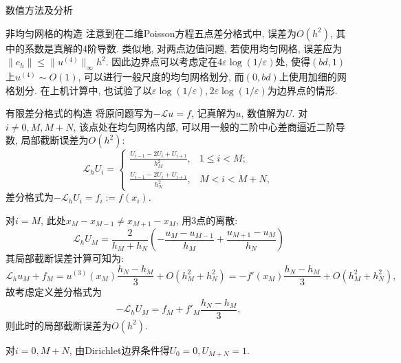 \documentclass{article}
\begin{document}
\begin{section}{数值方法及分析}
\begin{subsection}{非均匀网格的构造}
        注意到在二维Poisson方程五点差分格式中, 误差为$O(h^2)$, 其中的系数是真解的4阶导数. 类似地, 对两点边值问题, 若使用均匀网格, 误差应为
        $\|e_h\|\leq \|u^{(4)}\|_\infty h^2$. 因此边界点可以考虑定在$4\varepsilon\log(1/\varepsilon)$处, 使得$(bd,1)$上$u^{(4)}\sim O(1)$, 可以进行一般尺度的均匀网格划分, 
        而$(0,bd)$上使用加细的网格划分. 在上机计算中, 也试验了以$\varepsilon\log(1/\varepsilon),2\varepsilon\log(1/\varepsilon)$为边界点的情形.
    \end{subsection}
    \begin{subsection}{有限差分格式的构造}
        将原问题写为$-\mathcal{L}u=f$, 记真解为$u$, 数值解为$U$.
        对$i\neq 0,M,M+N$, 该点处在均匀网格内部, 可以用一般的二阶中心差商逼近二阶导数, 局部截断误差为$O(h^2)$:
        $$\mathcal{L}_h U_i = \left\{\begin{aligned}
            \frac{U_{i-1}-2U_i+U_{i+1}}{h_M^2}, & 1\leq i<M;\\
            \frac{U_{i-1}-2U_i+U_{i+1}}{h_N^2}, & M<i<M+N,
        \end{aligned}\right.$$
        差分格式为$-\mathcal{L}_h U_i = f_i:=f(x_i)$.

        对$i=M$, 此处$x_M-x_{M-1}\neq x_{M+1}-x_M$, 用3点的离散:
        $$\mathcal{L}_h U_M = \frac{2}{h_M+h_N}(-\frac{u_M-u_{M-1}}{h_M}+\frac{u_{M+1}-u_M}{h_N})$$
        其局部截断误差计算可知为:
        $$\mathcal{L}_h u_M + f_M= u^{(3)}(x_M)\frac{h_N-h_M}{3} + O(h_M^2+h_N^2) = -f'(x_M)\frac{h_N-h_M}{3} + O(h_M^2+h_N^2),$$
        故考虑定义差分格式为 $$-\mathcal{L}_h U_M = f_M + f'_M\frac{h_N-h_M}{3},$$
        则此时的局部截断误差为$O(h^2)$.

        对$i=0,M+N$, 由Dirichlet边界条件得$U_0=0,U_{M+N}=1$.


\end{subsection}
\end{section}
\end{document}
